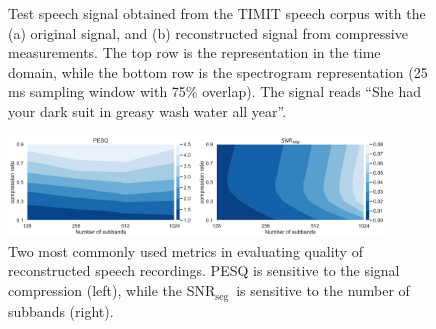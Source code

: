 \documentclass[10pt,a4paper,twoside]{article}
\newcommand{\snrseg}{SNR$_{\mathrm{seg}}$}
\begin{document}
\begin{figure}[tbp]
	\centering
	\quad %
	\caption{Test speech signal obtained from the TIMIT speech corpus with the (a) original signal, and (b) reconstructed signal from compressive measurements. The top row is the representation in the time domain, while the bottom row is the spectrogram representation (25 ms sampling window with 75\% overlap). The signal reads ``She had your dark suit in greasy wash water all year''.}\label{fig:spectrogram}
\end{figure}

\begin{figure}[tb]
	\centering
	\includegraphics[width=0.89\textwidth]{metrics.png}
	\caption{Two most commonly used metrics in evaluating quality of reconstructed speech recordings. PESQ is sensitive to the signal compression (left), while the \snrseg~is sensitive to the number of subbands (right).}
	\label{fig:pesq-snr}
\end{figure}
\end{document}
